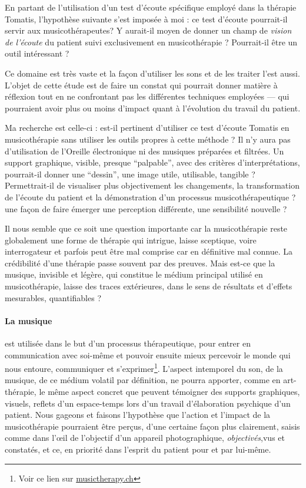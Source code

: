 En partant de l'utilisation d'un test d'écoute spécifique employé dans
la thérapie Tomatis, l'hypothèse suivante s'est imposée à moi : ce
test d'écoute pourrait-il servir aux musicothérapeutes? Y aurait-il
moyen de donner un champ de \emph{vision de l'écoute} du patient suivi
exclusivement en musicothérapie ? Pourrait-il être un outil
intéressant ?


Ce domaine est très vaste et la façon d'utiliser les sons et de les
traiter l'est aussi. L'objet de cette étude est de faire un constat
qui pourrait donner matière à réflexion tout en ne confrontant pas les
différentes techniques employées --- qui pourraient avoir plus ou %
moins d'impact quant à l'évolution du travail du patient.

Ma recherche est celle-ci : est-il pertinent d'utiliser ce test
d'écoute Tomatis en musicothérapie sans utiliser les outils propres à
cette méthode ? Il n'y aura pas d'utilisation de l'Oreille
électronique ni des musiques préparées et filtrées.  Un support
graphique, visible, presque ``palpable'', avec des critères
d'interprétations, pourrait-il donner une ``dessin'', une image utile,
utilisable, tangible ? Permettrait-il de visualiser plus objectivement
les changements, la transformation de l'écoute du patient et la
démonstration d'un processus musicothérapeutique ? %
une façon de faire émerger  %
une perception différente, une sensibilité
nouvelle ?

  Il nous semble que ce soit une
question importante car la musicothérapie reste globalement une forme de thérapie qui intrigue, laisse sceptique, voire  interrogateur et parfois peut être mal comprise car
en définitive mal connue. %
La crédibilité d'une thérapie
passe souvent par des preuves. Mais est-ce que la musique, invisible
et légère, qui constitue le médium principal utilisé en musicothérapie, laisse
des traces extérieures, dans le sens de résultats et d'effets mesurables, quantifiables ?
\paragraph{La musique} est utilisée dans le but d'un processus
thérapeutique, pour entrer en communication avec soi-même et pouvoir ensuite mieux percevoir le monde qui nous
entoure, communiquer et s'exprimer\footnote{%
Voir ce lien sur \href{http://www.musictherapy.ch/fr/musicotherapie/quest-ce-que-la-musicotherapie/}{musictherapy.ch}}.
L'aspect intemporel du son, de la musique, de ce médium volatil par
définition, ne pourra apporter, comme en art-thérapie, le
même aspect concret que peuvent témoigner des supports graphiques,
visuels, reflets d'un espace-temps lors d'un travail d'élaboration
psychique d'un patient. Nous gageons et faisons l'hypothèse que l'action et l'impact de la
musicothérapie pourraient être perçus, d'une certaine façon plus
clairement, saisis comme dans l'\oe il de l'objectif d'un appareil
photographique,\textsl{ objectivés},vus et constatés, et ce, en priorité dans l'esprit du
patient pour et par lui-même.

